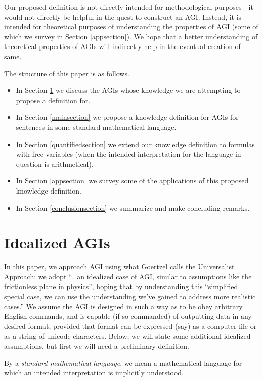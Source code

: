 \documentclass[runningheads]{llncs}
\begin{document}
Our proposed definition is not directly intended
for methodological purposes---it would not
directly be helpful in the quest to construct an AGI. Instead, it is intended for
theoretical purposes of understanding the properties of AGI (some of which
we survey in Section \ref{appsection}). We hope that a better
understanding of theoretical properties of AGIs will indirectly help in the eventual
creation of same.

The structure of this paper is as follows.
\begin{itemize}
  \item In Section \ref{agisection} we discuss the AGIs whose knowledge we are
  attempting to propose a definition for.
  \item In Section \ref{mainsection} we propose a knowledge definition for
  AGIs for sentences in some standard mathematical language.
  \item In Section \ref{quantifiedsection} we extend our knowledge definition
  to formulas with free variables (when the intended interpretation for the
  language in question is arithmetical).
  \item In Section \ref{appsection} we survey some of the applications of
  this proposed knowledge definition.
  \item In Section \ref{conclusionsection} we summarize and make concluding remarks.
\end{itemize}

\section{Idealized AGIs}
\label{agisection}



In this paper, we approach AGI using what
Goertzel \cite{goertzel2014artificial} calls
the Universalist Approach:
we adopt ``...an idealized case of AGI, similar to
assumptions like the frictionless plane in physics'', hoping that by
understanding this ``simplified special
case, we can use the understanding we've gained to address more realistic
cases.'' We assume the AGI is designed in such a way as to be obey arbitrary
English commands, and is capable (if so commanded) of outputting data in
any desired format, provided that format can be expressed (say) as a computer
file or as a string of unicode characters. Below, we will state some additional
idealized assumptions, but first we will need a preliminary definition.

\begin{definition}
By a \emph{standard mathematical language}, we mean a mathematical language for which an
intended interpretation is implicitly understood.
\end{definition}
\end{document}
